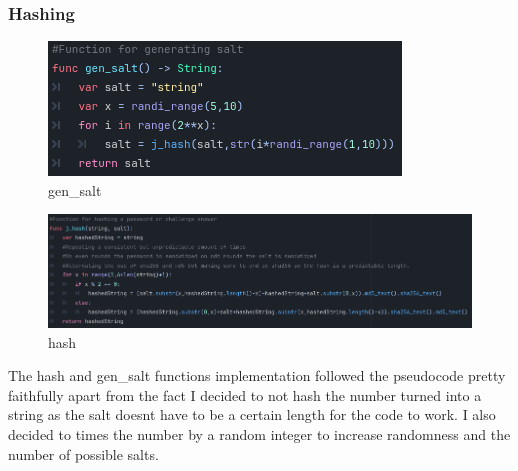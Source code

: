 \documentclass{article}
\begin{document}
        \subsubsection{Hashing}
        \begin{figure}[H]
                \centering
                \includegraphics{images/development/gen_salt.PNG}
                \caption{gen\_salt}
        \end{figure}
        \begin{figure}[H]
                \centering
                \includegraphics[width = \columnwidth]{images/development/hash.PNG}
                \caption{hash}
        \end{figure}
        \[\]
        The hash and gen\_salt functions implementation followed the pseudocode pretty faithfully apart from the fact I decided to not hash the number turned into a string as the salt doesnt have to be a certain length for the code to work. I also decided to times the number by a random integer to increase randomness and the number of possible salts.\\
\end{document}
